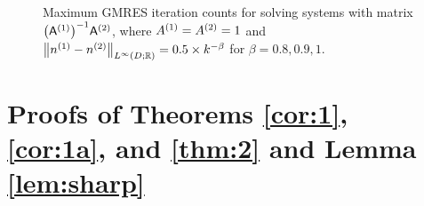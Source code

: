     \begin{figure}
      \centering

   \caption[Maximum GMRES iteration counts when $\NLiDRR{\nso-\nst} = 0.5\times  k^{-\beta}$ for $\beta = 0.8,0.9,1.$]{Maximum GMRES iteration counts for solving systems with matrix $\AmatoI\Amatt$, where ${A}^{(1)}={A}^{(2)}=1$ and $\NLiDRR{\nso-\nst} = 0.5\times  k^{-\beta}$ for $\beta = 0.8,0.9,1.$}\label{fig:linfinityn2}
\end{figure}
  



\section[Proofs of Theorems \MakeLowercase{\ref{cor:1}, \ref{cor:1a}, and \ref{thm:2}} and Lemma \MakeLowercase{\ref{lem:sharp}}]{Proofs of Theorems \ref{cor:1}, \ref{cor:1a}, and \ref{thm:2} and Lemma \ref{lem:sharp}}\label{sec:3}









